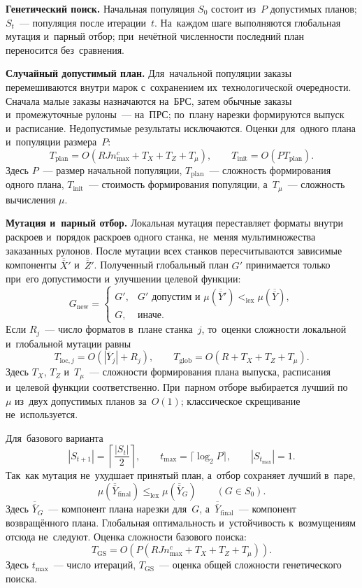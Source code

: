 \textbf{Генетический поиск.} Начальная популяция $S_0$ состоит из~$P$ допустимых планов; $S_t$~--- популяция после итерации~$t$. На~каждом шаге выполняются глобальная мутация и~парный отбор; при~нечётной численности последний план переносится без~сравнения.

\textbf{Случайный допустимый план.} Для~начальной популяции заказы перемешиваются внутри марок с~сохранением их~технологической очередности. Сначала малые заказы назначаются на~БРС, затем обычные заказы и~промежуточные рулоны~--- на~ПРС; по~плану нарезки формируются выпуск и~расписание. Недопустимые результаты исключаются. Оценки для~одного плана и~популяции размера~$P$:
\[
T_{\mathrm{plan}}=
O\!\left(RJn^c_{\max}+T_X+T_Z+T_\mu\right),
\qquad T_{\mathrm{init}}=O(PT_{\mathrm{plan}}).
\]
Здесь $P$~--- размер начальной популяции, $T_{\mathrm{plan}}$~--- сложность формирования одного плана, $T_{\mathrm{init}}$~--- стоимость формирования популяции, а~$T_\mu$~--- сложность вычисления $\mu$.

\textbf{Мутация и~парный отбор.} Локальная мутация переставляет форматы внутри раскроев и~порядок раскроев одного станка, не~меняя мультимножества заказанных рулонов. После мутации всех станков пересчитываются зависимые компоненты $\overline{\overline X}'$ и~$\overline{\overline Z}'$. Полученный глобальный план $G'$ принимается только при~его допустимости и~улучшении целевой функции:
\[
G_{\mathrm{new}}=
\begin{cases}
G',&G'\text{ допустим и }\mu(\overline{\overline Y}')
             <_{\mathrm{lex}}\mu(\overline{\overline Y}),\\
G,&\text{иначе}.
\end{cases}
\]
Если $R_j$~--- число форматов в~плане станка~$j$, то~оценки сложности локальной и~глобальной мутации равны
\[
T_{\mathrm{loc},j}=O(|\overline Y_j|+R_j),\qquad
T_{\mathrm{glob}}=O(R+T_X+T_Z+T_\mu).
\]
Здесь $T_X$, $T_Z$ и~$T_\mu$~--- сложности формирования плана выпуска, расписания и~целевой функции соответственно.
При~парном отборе выбирается лучший по~$\mu$ из~двух допустимых планов за~$O(1)$; классическое скрещивание не~используется.

Для~базового варианта
\[
|S_{t+1}|=\left\lceil\frac{|S_t|}{2}\right\rceil,\qquad
t_{\max}=\lceil\log_2P\rceil,\qquad |S_{t_{\max}}|=1.
\]
Так~как мутация не~ухудшает принятый план, а~отбор сохраняет лучший в~паре,
\[
\mu(\overline{\overline Y}_{\mathrm{final}})
\leq_{\mathrm{lex}}\mu(\overline{\overline Y}_G)
\qquad(G\in S_0).
\]
Здесь $\overline{\overline Y}_G$~--- компонент плана нарезки для~$G$, а~$\overline{\overline Y}_{\mathrm{final}}$~--- компонент возвращённого плана. Глобальная оптимальность и~устойчивость к~возмущениям отсюда не~следуют. Оценка сложности базового поиска:
\[
T_{\mathrm{GS}}=
O\!\left(P(RJn^c_{\max}+T_X+T_Z+T_\mu)\right).
\]
Здесь $t_{\max}$~--- число итераций, $T_{\mathrm{GS}}$~--- оценка общей сложности генетического поиска.

